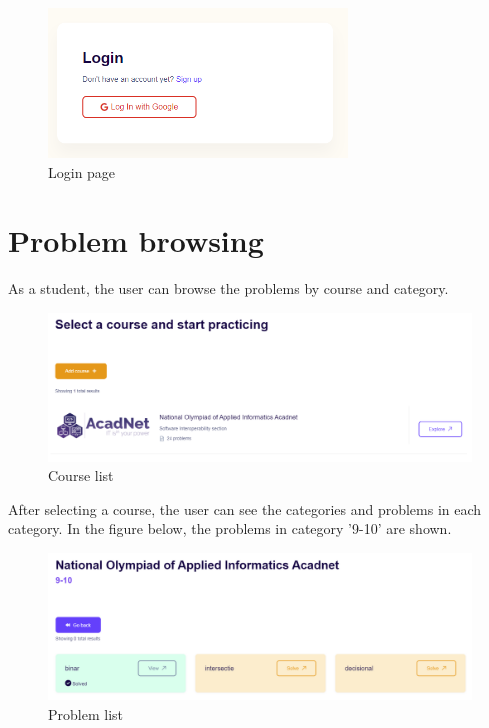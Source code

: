 \documentclass[12pt,a4paper]{report}
\begin{document}
\begin{figure}[h]
	\centering
	\includegraphics[width=300px]{./pics/login.png}
	\caption{Login page}
	\label{fig:login-page}
\end{figure}

\section{Problem browsing}
As a student, the user can browse the problems by course and category.

\begin{figure}[h]
	\centering
	\includegraphics[width=\linewidth]{./pics/course.png}
	\caption{Course list}
	\label{fig:course}
\end{figure}

After selecting a course, the user can see the categories and problems in each category. In the figure below, the problems in category '9-10' are shown.

\begin{figure}[h]
	\centering
	\includegraphics[width=\linewidth]{./pics/problem-list.png}
	\caption{Problem list}
	\label{fig:problem-list}
\end{figure}
\end{document}
